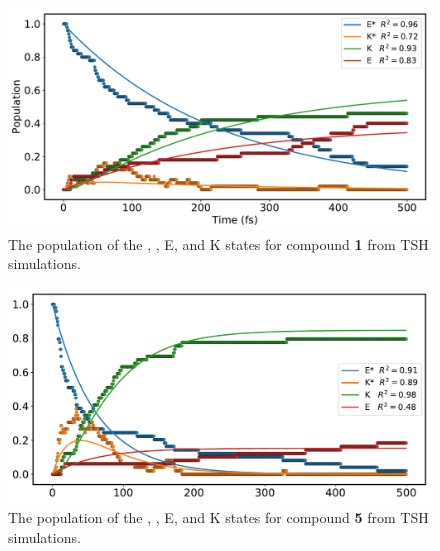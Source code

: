 \begin{figure}[t]
\centering
  \includegraphics[width=0.9\linewidth]{3nonradiativedecay/HC_1_global_fit.pdf}
  \caption[Global fit for enol and keto states for \textbf{HC1} in nonadiabatic dynamics simulations]{The population of the \Estar{}, \Kstar{}, E, and K states for compound \textbf{1} from \ac{TSH} simulations.}
  \label{figure: HC_1_Global}
\end{figure}
\begin{figure}[t]
\centering
  \includegraphics[width=0.9\linewidth]{3nonradiativedecay/HC_5_global_fit.pdf}
  \caption[Global fit for enol and keto states for \textbf{HC5} in nonadiabatic dynamics simulations]{The population of the \Estar{}, \Kstar{}, E, and K states for compound \textbf{5} from \ac{TSH} simulations.}
  \label{figure: HC_5_Global}
\end{figure}

